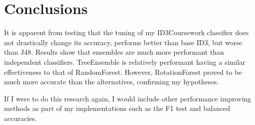 \documentclass{cmppgr}
\begin{document}
\section{Conclusions}
It is apparent from testing that the tuning of my ID3Coursework classifier does 
not drastically change its accuracy, performs better than base ID3, but worse than 
J48. Results show that ensembles are much more performant than independent classifiers. 
TreeEnsemble is relatively performant having a similar effectiveness to that of 
RandomForest. However, RotationForest proved to be much more accurate than the 
alternatives, confirming my hypotheses.

If I were to do this research again, I would include other performance improving 
methods as part of my implementations such as the F1 test and balanced accuracies.




 

\appendix
\end{document}
